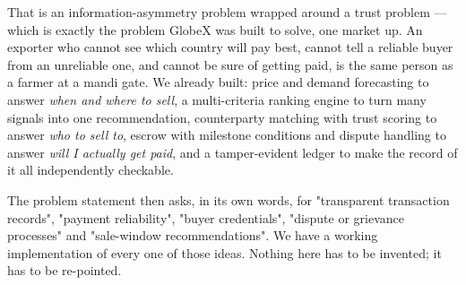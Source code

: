\documentclass[11pt]{article}
\begin{document}
That is an information-asymmetry problem wrapped around a trust problem --- which is exactly the problem
GlobeX was built to solve, one market up. An exporter who cannot see which country will pay best, cannot
tell a reliable buyer from an unreliable one, and cannot be sure of getting paid, is the same person as a
farmer at a mandi gate. We already built: price and demand forecasting to answer \emph{when and where to
sell}, a multi-criteria ranking engine to turn many signals into one recommendation, counterparty matching
with trust scoring to answer \emph{who to sell to}, escrow with milestone conditions and dispute handling
to answer \emph{will I actually get paid}, and a tamper-evident ledger to make the record of it all
independently checkable.

The problem statement then asks, in its own words, for "transparent transaction records", "payment
reliability", "buyer credentials", "dispute or grievance processes" and "sale-window recommendations". We
have a working implementation of every one of those ideas. Nothing here has to be invented; it has to be
re-pointed.
\end{document}
